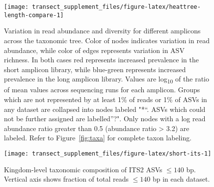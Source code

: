 \documentclass[
]{article}
\begin{document}
\begin{figure}

{\centering \texttt{[image: transect\_supplement\_files/figure-latex/heattree-length-compare-1]} 

}

\caption[Variation in read abundance and diversity for different amplicons across the taxonomic tree]{Variation in read abundance and diversity for different amplicons across the taxonomic tree. Color of nodes indicates variation in read abundance, while color of edges represents variation in ASV richness.
In both cases red represents increased prevalence in the short amplicon library, while blue-green represents increased prevalence in the long amplicon library.
Values are log\textsubscript{10} of the ratio of mean values across sequencing runs for each amplicon.
Groups which are not represented by at least 1\% of reads or 1\% of ASVs in any dataset are collapsed into nodes labeled "*``.
ASVs which could not be further assigned are labelled''?".
Only nodes with a log read abundance ratio greater than 0.5 (abundance ratio \textgreater{} 3.2) are labeled.
Refer to Figure~\ref{fig:taxa} for complete taxon labeling.}\label{fig:heattree-length-compare}
\end{figure}





\begin{figure}

{\centering \texttt{[image: transect\_supplement\_files/figure-latex/short-its-1]} 

}

\caption[Kingdom-level taxonomic composition of ITS2 ASVs \(\le 140\) bp]{Kingdom-level taxonomic composition of ITS2 ASVs \(\le 140\) bp. Vertical axis shows fraction of total reads \(\le 140\) bp in each dataset.}\label{fig:short-its}
\end{figure}
\end{document}
